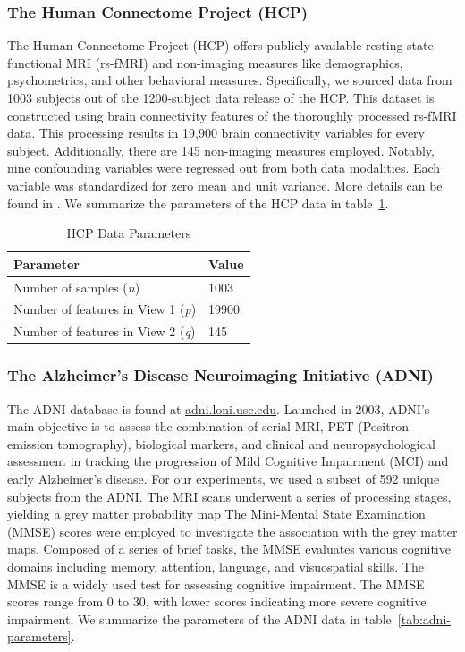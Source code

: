 \subsubsection{The Human Connectome Project (HCP)}

The Human Connectome Project (HCP) offers publicly available resting-state functional MRI (rs-fMRI) and non-imaging measures like demographics, psychometrics, and other behavioral measures.
Specifically, we sourced data from 1003 subjects out of the 1200-subject data release of the HCP.
This dataset is constructed using brain connectivity features of the thoroughly processed rs-fMRI data.
This processing results in 19,900 brain connectivity variables for every subject.
Additionally, there are 145 non-imaging measures employed.
Notably, nine confounding variables were regressed out from both data modalities.
Each variable was standardized for zero mean and unit variance.
More details can be found in \cite{smith2015positive, mihalik2022canonical}.
We summarize the parameters of the HCP data in table~\ref{tab:hcp-parameters}.

\begin{table}
\centering
\caption{HCP Data Parameters}
\begin{tabular}{| l | l |}
\hline
\textbf{Parameter} & \textbf{Value} \\
\hline
Number of samples (\textit{n}) & 1003 \\
Number of features in View 1 (\textit{p}) & 19900 \\
Number of features in View 2 (\textit{q}) & 145 \\
\hline
\end{tabular}\label{tab:hcp-parameters}
\end{table}

\subsubsection{The Alzheimer's Disease Neuroimaging Initiative (ADNI)}

The ADNI database is found at \url{adni.loni.usc.edu}.
Launched in 2003, ADNI's main objective is to assess the combination of serial MRI, PET (Positron emission tomography), biological markers, and clinical and neuropsychological assessment in tracking the progression of Mild Cognitive Impairment (MCI) and early Alzheimer’s disease.
For our experiments, we used a subset of 592 unique subjects from the ADNI. The MRI scans underwent a series of processing stages, yielding a grey matter probability map
The Mini-Mental State Examination (MMSE) scores were employed to investigate the association with the grey matter maps.
Composed of a series of brief tasks, the MMSE evaluates various cognitive domains including memory, attention, language, and visuospatial skills.
The MMSE is a widely used test for assessing cognitive impairment.
The MMSE scores range from 0 to 30, with lower scores indicating more severe cognitive impairment.
We summarize the parameters of the ADNI data in table~\ref{tab:adni-parameters}.

